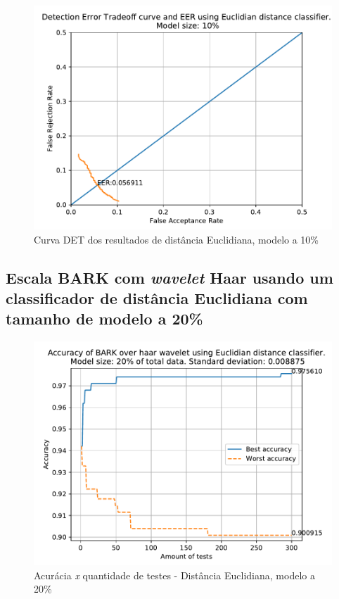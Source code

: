 			\begin{figure}[!h]
				\centering
				\includegraphics[width=.6\linewidth]{images/results/det/DET_for_classifier_Euclidian_10}
				\caption{Curva DET dos resultados de distância Euclidiana, modelo a 10\%}
				\label{fig:detforclassifiereuclidian10}
			\end{figure}

			\FloatBarrier
					
		\subsection{Escala BARK com \textit{wavelet} Haar usando um classificador de distância Euclidiana com tamanho de modelo a 20\%}
			
			
			\begin{figure}[ht]
				\centering
				\includegraphics[width=.6\linewidth]{images/results/confusionMatrices/classifier_Euclidian_20}
				\caption{Acurácia \textit{x} quantidade de testes - Distância Euclidiana, modelo a 20\%}
				\label{fig:classifiereuclidian20}
			\end{figure}
		
